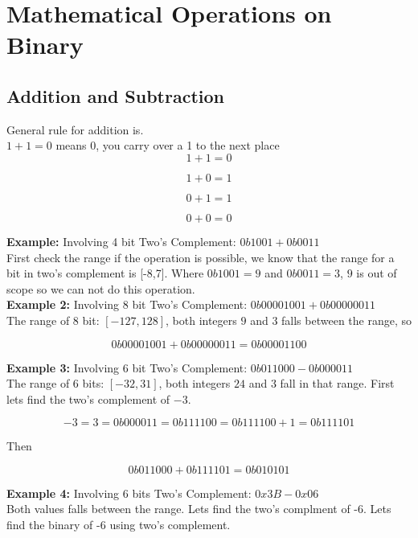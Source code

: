 \documentclass{article}
\begin{document}
\section{Mathematical Operations on Binary}
\subsection*{Addition and Subtraction}
\noindent General rule for addition is. \\

$1 + 1 = 0$ means 0, you carry over a 1 to the next place
\[
1 + 1 = 0 
\]

\[
1 + 0 = 1
\]

\[
0 + 1 = 1
\]

\[
0 + 0 = 0
\]

\noindent \textbf{Example:} Involving 4 bit Two's Complement: $0b1001 + 0b0011$ \\

First check the range if the operation is possible, we know that the range for a 
bit in two's complement is [-8,7].
Where $0b1001 = 9$ and $0b0011 = 3$, $9$ is out of scope so we can not do this
operation. \\

\noindent \textbf{Example 2:} Involving 8 bit Two's Complement: $0b0000 1001
+ 0b0000 0011$ \\

The range of 8 bit: $[-127,128]$, both integers $9$ and $3$ falls between the 
range, so

\[
0b0000 1001 + 0b0000 0011 = 0b0000 1100
\]

\noindent \textbf{Example 3:} Involving 6 bit Two's Complement: $0b011 000 - 
0b000 011$ \\

The range of 6 bits: $[-32,31]$, both integers $24$ and $3$ fall in that range.
First lets find the two's complement of $-3$. 

\[
-3 = 3 = 0b000 011 = 0b111 100 = 0b111 100 + 1 = 0b111 101
\]

Then

\[
0b011 000 + 0b111 101 = 0b010101
\]

\noindent \textbf{Example 4:} Involving 6 bits Two's Complement: $0x3B - 0x06$ \\

Both values falls between the range. Lets find the two's complment of -6. Lets find the binary of -6 using two's 
complement.\\
\end{document}
